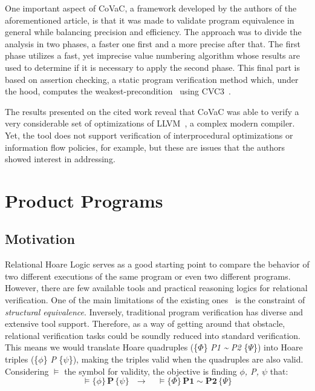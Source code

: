 One important aspect of CoVaC, a framework developed by the authors of the aforementioned article, is that it was made to validate program equivalence in general while balancing precision and efficiency.
The approach was to divide the analysis in two phases, a faster one first and a more precise after that.
The first phase utilizes a fast, yet imprecise value numbering algorithm whose results are used to determine if it is necessary to apply the second phase. 
This final part is based on assertion checking, a static program verification method which, under the hood, computes the weakest-precondition~\cite{DBLP:books/ph/Dijkstra76} using CVC3~\cite{cvc3}. 

The results presented on the cited work reveal that CoVaC was able to verify a very considerable set of optimizations of LLVM~\cite{llvm}, a complex modern compiler.
Yet, the tool does not support verification of interprocedural optimizations or information flow policies, for example, but these are issues that the authors showed interest in addressing.


\section{Product Programs} 
\label{sec:product_programs}

\subsection{Motivation} 
\label{subsec:product_programs_motivation}

Relational Hoare Logic serves as a good starting point to compare the behavior of two different executions of the same program or even two different programs.
However, there are few available tools and practical reasoning logics for relational verification.
One of the main limitations of the existing ones~\cite{DBLP:conf/popl/Benton04, DBLP:journals/tcs/Yang07} is the constraint of \emph{structural equivalence}.
Inversely, traditional program verification has diverse and extensive tool support.
Therefore, as a way of getting around that obstacle, relational verification tasks could be soundly reduced into standard verification.
This means we would translate Hoare quadruples (\{$\Phi$\} \emph{P1} \emph{\textasciitilde} \emph{P2} \{$\Psi$\}) into Hoare triples (\{$\phi$\} \emph{P} \{$\psi$\}), making the triples valid when the quadruples are also valid.
Considering $\vDash$ the symbol for validity, the objective is finding \emph{$\phi$, P, $\psi$} that:
\[ \vDash \{\phi\} \, \textbf{P} \, \{\psi\} \ \ \ \rightarrow \ \ \ \ \ \vDash \{\Phi\} \, \textbf{P1} \sim \textbf{P2} \, \{\Psi\} \]

